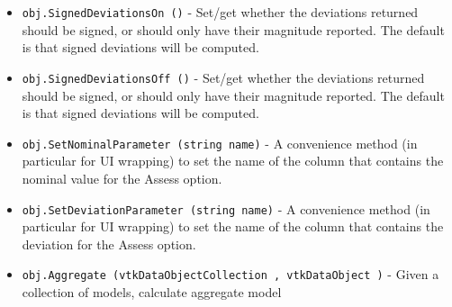 \begin{itemize}
\item  \verb|obj.SignedDeviationsOn ()| -  Set/get whether the deviations returned should be signed, or should
 only have their magnitude reported.
 The default is that signed deviations will be computed.

\item  \verb|obj.SignedDeviationsOff ()| -  Set/get whether the deviations returned should be signed, or should
 only have their magnitude reported.
 The default is that signed deviations will be computed.

\item  \verb|obj.SetNominalParameter (string name)| -  A convenience method (in particular for UI wrapping) to set the name of the
 column that contains the nominal value for the Assess option.

\item  \verb|obj.SetDeviationParameter (string name)| -  A convenience method (in particular for UI wrapping) to set the name of the
 column that contains the deviation for the Assess option.

\item  \verb|obj.Aggregate (vtkDataObjectCollection , vtkDataObject )| -  Given a collection of models, calculate aggregate model

\end{itemize}
